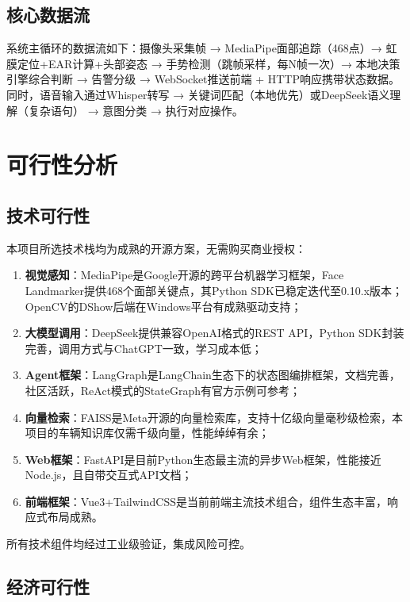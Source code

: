\documentclass[a4paper]{article}
\begin{document}
\subsection{核心数据流}

系统主循环的数据流如下：摄像头采集帧 → MediaPipe面部追踪（468点）→ 虹膜定位+EAR计算+头部姿态 → 手势检测（跳帧采样，每N帧一次）→ 本地决策引擎综合判断 → 告警分级 → WebSocket推送前端 + HTTP响应携带状态数据。同时，语音输入通过Whisper转写 → 关键词匹配（本地优先）或DeepSeek语义理解（复杂语句） → 意图分类 → 执行对应操作。

\section{可行性分析}

\subsection{技术可行性}

本项目所选技术栈均为成熟的开源方案，无需购买商业授权：

\begin{enumerate}
    \item \textbf{视觉感知}：MediaPipe是Google开源的跨平台机器学习框架，Face Landmarker提供468个面部关键点，其Python SDK已稳定迭代至0.10.x版本；OpenCV的DShow后端在Windows平台有成熟驱动支持；
    \item \textbf{大模型调用}：DeepSeek提供兼容OpenAI格式的REST API，Python SDK封装完善，调用方式与ChatGPT一致，学习成本低；
    \item \textbf{Agent框架}：LangGraph是LangChain生态下的状态图编排框架，文档完善，社区活跃，ReAct模式的StateGraph有官方示例可参考；
    \item \textbf{向量检索}：FAISS是Meta开源的向量检索库，支持十亿级向量毫秒级检索，本项目的车辆知识库仅需千级向量，性能绰绰有余；
    \item \textbf{Web框架}：FastAPI是目前Python生态最主流的异步Web框架，性能接近Node.js，且自带交互式API文档；
    \item \textbf{前端框架}：Vue3+TailwindCSS是当前前端主流技术组合，组件生态丰富，响应式布局成熟。
\end{enumerate}

所有技术组件均经过工业级验证，集成风险可控。

\subsection{经济可行性}
\end{document}
